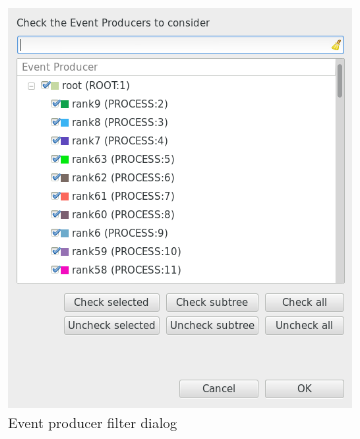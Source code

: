 \documentclass[twoside]{article}
\begin{document}
\begin{sloppypar}
\begin{figure}[h!]
 \centering
 \begin{subfigure}[c]{0.46\textwidth}
    \includegraphics[width=1.0\textwidth]{images/ep_filter.png}
    \caption{Event producer filter dialog}
    \label{fig:eprod_dialog}
 \end{subfigure}%
 \hspace{30pt}
 \begin{subfigure}[c]{0.46\textwidth}

\end{subfigure}
\end{figure}
\end{sloppypar}
\end{document}

